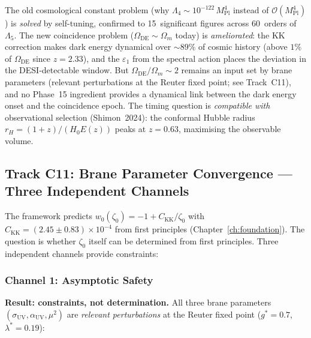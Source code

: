 \noindent
The old cosmological constant problem (why $\Lambda_4 \sim 10^{-122}\,M_{\mathrm{Pl}}^4$ instead of $\mathcal{O}(M_{\mathrm{Pl}}^4)$) is \emph{solved} by self-tuning, confirmed to 15~significant figures across 60~orders of $\Lambda_5$. The new coincidence problem ($\Omega_{\mathrm{DE}} \sim \Omega_m$ today) is \emph{ameliorated}: the KK correction makes dark energy dynamical over ${\sim}89\%$ of cosmic history (above $1\%$ of $\Omega_{\mathrm{DE}}$ since $z = 2.33$), and the $\varepsilon_1$ from the spectral action places the deviation in the DESI-detectable window. But $\Omega_{\mathrm{DE}}/\Omega_m \sim 2$ remains an input set by brane parameters (relevant perturbations at the Reuter fixed point; see Track~C11), and no Phase~15 ingredient provides a dynamical link between the dark energy onset and the coincidence epoch. The timing question is \emph{compatible with} observational selection (Shimon~2024): the conformal Hubble radius $r_H = (1+z)/(H_0 E(z))$ peaks at $z = 0.63$, maximising the observable volume.



\subsection{Track C11: Brane Parameter Convergence --- Three Independent Channels}
\label{app:brane-convergence}

The framework predicts $w_0(\zeta_0) = -1 + C_\mathrm{KK}/\zeta_0$ with $C_\mathrm{KK} = (2.45 \pm 0.83) \times 10^{-4}$ from first principles (Chapter~\ref{ch:foundation}). The question is whether $\zeta_0$ itself can be determined from first principles. Three independent channels provide constraints:

\subsubsection{Channel 1: Asymptotic Safety}

\textbf{Result: constraints, not determination.} All three brane parameters $(\sigma_{\mathrm{UV}}, \alpha_{\mathrm{UV}}, \mu^2)$ are \emph{relevant perturbations} at the Reuter fixed point ($g^* = 0.7$, $\lambda^* = 0.19$):


